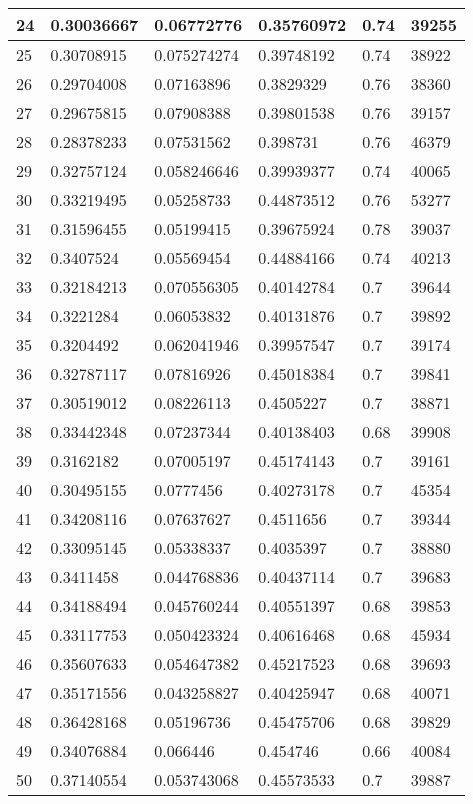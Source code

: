 \begin{longtable}{|l|l|l|l|l|l|}
24 & 0.30036667 & 0.06772776 & 0.35760972 & 0.74 & 39255 \\ \hline 
25 & 0.30708915 & 0.075274274 & 0.39748192 & 0.74 & 38922 \\ \hline 
26 & 0.29704008 & 0.07163896 & 0.3829329 & 0.76 & 38360 \\ \hline 
27 & 0.29675815 & 0.07908388 & 0.39801538 & 0.76 & 39157 \\ \hline 
28 & 0.28378233 & 0.07531562 & 0.398731 & 0.76 & 46379 \\ \hline 
29 & 0.32757124 & 0.058246646 & 0.39939377 & 0.74 & 40065 \\ \hline 
30 & 0.33219495 & 0.05258733 & 0.44873512 & 0.76 & 53277 \\ \hline 
31 & 0.31596455 & 0.05199415 & 0.39675924 & 0.78 & 39037 \\ \hline 
32 & 0.3407524 & 0.05569454 & 0.44884166 & 0.74 & 40213 \\ \hline 
33 & 0.32184213 & 0.070556305 & 0.40142784 & 0.7 & 39644 \\ \hline 
34 & 0.3221284 & 0.06053832 & 0.40131876 & 0.7 & 39892 \\ \hline 
35 & 0.3204492 & 0.062041946 & 0.39957547 & 0.7 & 39174 \\ \hline 
36 & 0.32787117 & 0.07816926 & 0.45018384 & 0.7 & 39841 \\ \hline 
37 & 0.30519012 & 0.08226113 & 0.4505227 & 0.7 & 38871 \\ \hline 
38 & 0.33442348 & 0.07237344 & 0.40138403 & 0.68 & 39908 \\ \hline 
39 & 0.3162182 & 0.07005197 & 0.45174143 & 0.7 & 39161 \\ \hline 
40 & 0.30495155 & 0.0777456 & 0.40273178 & 0.7 & 45354 \\ \hline 
41 & 0.34208116 & 0.07637627 & 0.4511656 & 0.7 & 39344 \\ \hline 
42 & 0.33095145 & 0.05338337 & 0.4035397 & 0.7 & 38880 \\ \hline 
43 & 0.3411458 & 0.044768836 & 0.40437114 & 0.7 & 39683 \\ \hline 
44 & 0.34188494 & 0.045760244 & 0.40551397 & 0.68 & 39853 \\ \hline 
45 & 0.33117753 & 0.050423324 & 0.40616468 & 0.68 & 45934 \\ \hline 
46 & 0.35607633 & 0.054647382 & 0.45217523 & 0.68 & 39693 \\ \hline 
47 & 0.35171556 & 0.043258827 & 0.40425947 & 0.68 & 40071 \\ \hline 
48 & 0.36428168 & 0.05196736 & 0.45475706 & 0.68 & 39829 \\ \hline 
49 & 0.34076884 & 0.066446 & 0.454746 & 0.66 & 40084 \\ \hline 
50 & 0.37140554 & 0.053743068 & 0.45573533 & 0.7 & 39887 \\ \hline 
\end{longtable}